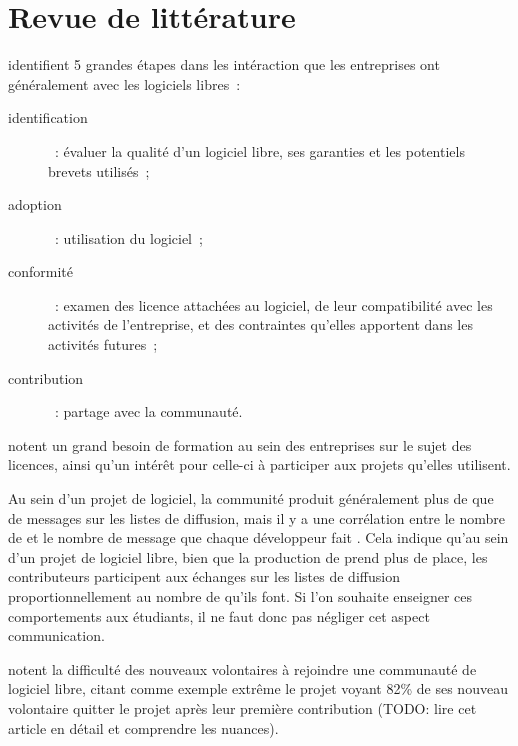\chapter{Revue de littérature}

 identifient 5 grandes étapes dans les intéraction que les entreprises ont
généralement avec les logiciels libres :
\begin{description}
    \item[identification] : évaluer la qualité d'un logiciel libre, ses garanties et les potentiels brevets
        utilisés ;
    \item[adoption] : utilisation du logiciel ;
    \item[conformité] : examen des licence attachées au logiciel, de leur compatibilité avec les activités de
        l'entreprise, et des contraintes qu'elles apportent dans les activités futures ;
    \item[contribution] : partage avec la communauté.
\end{description}

\textcite{strategies-2012} notent un grand besoin de formation au sein des entreprises sur le sujet des
licences, ainsi qu'un intérêt pour celle-ci à participer aux projets qu'elles utilisent.

Au sein d'un projet de logiciel, la communité produit généralement plus de  que de messages sur
les listes de diffusion, mais il y a une corrélation entre le nombre de  et le nombre de
message que chaque développeur fait . Cela indique qu'au sein d'un
projet de logiciel libre, bien que la production de  prend plus de place, les contributeurs
participent aux échanges sur les listes de diffusion proportionnellement au nombre de  qu'ils
font. Si l'on souhaite enseigner ces comportements aux étudiants, il ne faut donc pas négliger cet aspect
communication.

 notent la difficulté des nouveaux volontaires à rejoindre une communauté de
logiciel libre, citant comme exemple extrême le projet  voyant 82\% de ses nouveau
volontaire quitter le projet après leur première contribution  (TODO: lire
cet article en détail et comprendre les nuances).
